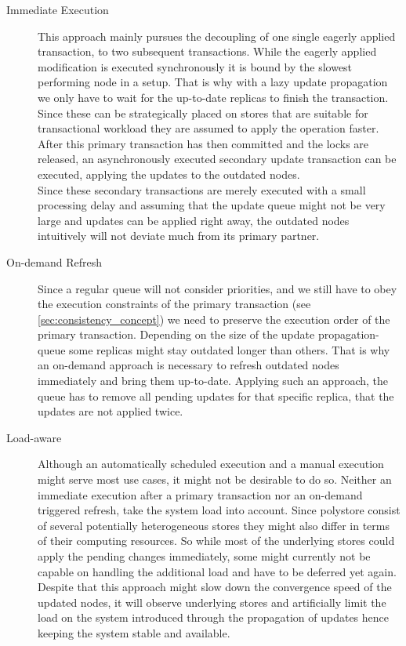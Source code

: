 \begin{description}
    \item[Immediate Execution] This approach mainly pursues the decoupling of one single eagerly applied transaction, to two subsequent transactions.
    While the eagerly applied modification is executed synchronously it is bound by the slowest performing node in a setup.
    That is why with a lazy update propagation we only have to wait for the up-to-date replicas to finish the transaction.
    Since these can be strategically placed on stores that are suitable for transactional workload they are assumed to apply the operation faster.
    After this primary transaction has then committed and the locks are released, an asynchronously executed secondary update transaction can be executed, 
    applying the updates to the outdated nodes.\\
    Since these secondary transactions are merely executed with a small processing delay and assuming that the update queue might not be very large and 
    updates can be applied right away, the outdated nodes intuitively will not deviate much from its primary partner.

    \item[On-demand Refresh] Since a regular queue will not consider priorities, and we still have to obey the execution constraints of the primary transaction (see \ref{sec:consistency_concept})
    we need to preserve the execution order of the primary transaction. Depending on the size of the update propagation-queue some replicas might stay outdated longer than others.
    That is why an on-demand approach is necessary to refresh outdated nodes immediately and bring them up-to-date.
    Applying such an approach, the queue has to remove all pending updates for that specific replica, that the updates are not applied twice. 
    
    \item[Load-aware] Although an automatically scheduled execution and a manual execution might serve most use cases, it might not be desirable to do so.
    Neither an immediate execution after a primary transaction nor an on-demand triggered refresh, take the system load into account.
    Since polystore consist of several potentially heterogeneous stores they might also differ in terms of their computing resources.
    So while most of the underlying stores could apply the pending changes immediately, some might currently not be capable on handling the additional load and have to 
    be deferred yet again. Despite that this approach might slow down the convergence speed of the updated nodes, 
    it will observe underlying stores and artificially limit the load on the system introduced through the propagation of updates hence keeping the system stable and available.


\end{description}
